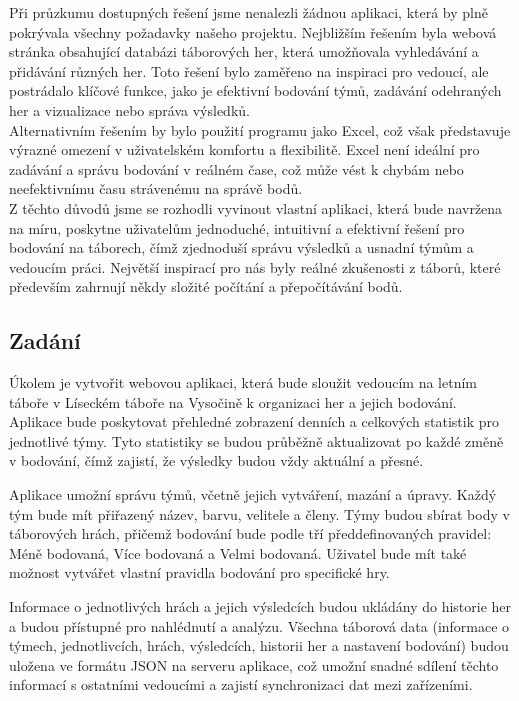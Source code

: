 \documentclass[a4paper, 12pt]{article} %
\begin{document}
Při průzkumu dostupných řešení jsme nenalezli žádnou aplikaci, která by plně pokrývala 
všechny požadavky našeho projektu. Nejbližším řešením byla webová stránka obsahující 
databázi táborových her, která umožňovala vyhledávání a přidávání různých her. Toto 
řešení bylo zaměřeno na inspiraci pro vedoucí, ale postrádalo klíčové funkce, jako je 
efektivní bodování týmů, zadávání odehraných her a vizualizace nebo správa výsledků. \\
Alternativním řešením by bylo použití programu jako Excel, což však představuje výrazné 
omezení v uživatelském komfortu a flexibilitě. Excel není ideální pro zadávání a správu 
bodování v reálném čase, což může vést k chybám nebo neefektivnímu času strávenému na správě 
bodů. \\
Z těchto důvodů jsme se rozhodli vyvinout vlastní aplikaci, která bude navržena na míru, 
poskytne uživatelům jednoduché, intuitivní a efektivní řešení pro bodování na táborech, 
čímž zjednoduší správu výsledků a usnadní týmům a vedoucím práci. Největší inspirací pro nás
byly reálné zkušenosti z táborů, které především zahrnují někdy složité počítání a přepočítávání
bodů.

\subsection{Zadání}

Úkolem je vytvořit webovou aplikaci, která bude sloužit vedoucím na letním táboře v 
Líseckém táboře na Vysočině k organizaci her a jejich bodování. Aplikace bude poskytovat 
přehledné zobrazení denních a celkových statistik pro jednotlivé týmy. Tyto statistiky se 
budou průběžně aktualizovat po každé změně v bodování, čímž zajistí, že výsledky budou vždy 
aktuální a přesné.

Aplikace umožní správu týmů, včetně jejich vytváření, mazání a úpravy. Každý tým bude mít 
přiřazený název, barvu, velitele a členy. Týmy budou sbírat body v táborových hrách, přičemž 
bodování bude podle tří předdefinovaných pravidel: Méně bodovaná, Více bodovaná a Velmi bodovaná. Uživatel bude mít také možnost vytvářet vlastní pravidla bodování pro specifické hry. 

Informace o jednotlivých hrách a jejich výsledcích budou ukládány do historie her a budou 
přístupné pro nahlédnutí a analýzu. Všechna táborová data (informace o týmech, jednotlivcích, 
hrách, výsledcích, historii her a nastavení bodování) budou uložena ve formátu JSON na 
serveru aplikace, což umožní snadné sdílení těchto informací s ostatními vedoucími a zajistí 
synchronizaci dat mezi zařízeními.
\end{document}

